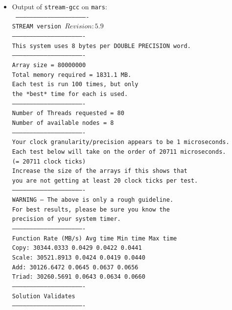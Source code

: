 \documentclass[]{article}
\begin{document}
\begin{itemize}
    \newpage
    
    \item Output of \texttt{stream-gcc} on \texttt{mars}: \\
    \texttt{\tiny 
------------------------------------------------------------- \\
STREAM version $Revision: 5.9 $ \\
------------------------------------------------------------- \\
This system uses 8 bytes per DOUBLE PRECISION word. \\
------------------------------------------------------------- \\
Array size = 80000000 \\
Total memory required = 1831.1 MB. \\
Each test is run 100 times, but only \\
the *best* time for each is used. \\
------------------------------------------------------------- \\
Number of Threads requested = 80 \\
Number of available nodes = 8 \\
------------------------------------------------------------- \\
Your clock granularity/precision appears to be 1 microseconds. \\
Each test below will take on the order of 20711 microseconds. \\
   (= 20711 clock ticks) \\
Increase the size of the arrays if this shows that \\
you are not getting at least 20 clock ticks per test. \\
------------------------------------------------------------- \\
WARNING -- The above is only a rough guideline. \\
For best results, please be sure you know the \\
precision of your system timer. \\
------------------------------------------------------------- \\
Function      Rate (MB/s)   Avg time     Min time     Max time \\
Copy:       30344.0333       0.0429       0.0422       0.0441 \\
Scale:      30521.8913       0.0424       0.0419       0.0440 \\
Add:        30126.6472       0.0645       0.0637       0.0656 \\
Triad:      30260.5691       0.0643       0.0634       0.0660 \\
------------------------------------------------------------- \\
Solution Validates \\
------------------------------------------------------------- \\
    }
\end{itemize}
\end{document}
